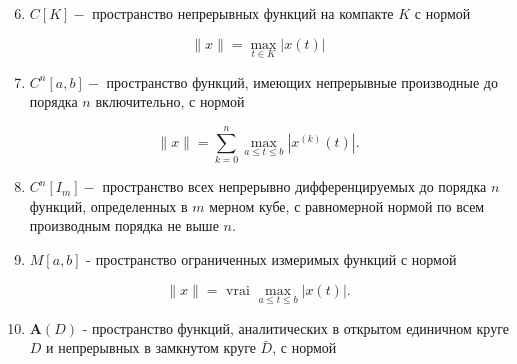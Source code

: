 \documentclass[10pt]{article}
\begin{document}
\begin{enumerate}

  \setcounter{enumi}{5}

  \item $C[K]-$ пространство непрерывных функций на компакте $K$ с нормой

\end{enumerate}



\[

\|x\|=\max _{t \in K}|x(t)|

\]



\begin{enumerate}

  \setcounter{enumi}{6}

  \item $C^{n}[a, b]-$ пространство функций, имеющих непрерывные производные до порядка $n$ включительно, с нормой

\end{enumerate}



\[

\|x\|=\sum_{k=0}^{n} \max _{a \leqslant t \leqslant b}\left|x^{(k)}(t)\right| .

\]



\begin{enumerate}

  \setcounter{enumi}{7}

  \item $C^{n}\left[I_{m}\right]-$ пространство всех непрерывно дифференцируемых до порядка $n$ функций, определенных в $m$ мерном кубе, с равномерной нормой по всем производным порядка не выше $n$.



  \item $M[a, b]$ - пространство ограниченных измеримых функций с нормой



\end{enumerate}



\[

\|x\|=\text { vrai } \max _{a \leqslant t \leqslant b}|x(t)| .

\]



\begin{enumerate}

  \setcounter{enumi}{9}

  \item $\boldsymbol{A}(D)$ - пространство функций, аналитических в открытом единичном круге $D$ и непрерывных в замкнутом круге $\bar{D}$, с нормой

\end{enumerate}
\end{document}
